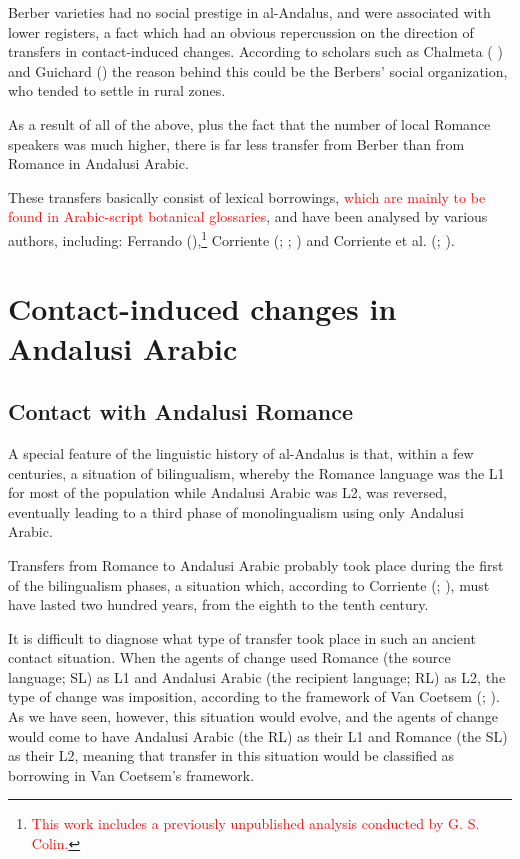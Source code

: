 \documentclass[output=paper,modfonts,nonflat]{langsci/langscibook}
\begin{document}
Berber varieties had no social prestige in al-Andalus, and were associated with lower registers, a fact which had an obvious repercussion on the direction of transfers in contact-induced changes. According to scholars such as Chalmeta ( \citeyear[160]{Chalmeta2003}) and Guichard (\citeyear{Guichard1995}) the reason behind this could be the Berbers’ social organization, who tended to settle in rural zones. 

As a result of all of the above, plus the fact that the number of local Romance speakers was much higher, there is far less transfer from Berber than from Romance in Andalusi Arabic. 

These transfers basically consist of lexical borrowings, \textcolor{red}{which are mainly to be found in Arabic-script botanical glossaries},  and have been analysed by various authors, including: Ferrando (\citeyear{Ferrando1997}),\footnote{\textcolor{red}{This work includes a previously unpublished analysis conducted by G. S. Colin.}} Corriente (\citeyear{Corriente1981}; \citeyear{Corriente1998Berber}; \citeyear{Corriente2002}) and Corriente et al. (\citeyear{CorrientePereiraVicente2017}; \citeyear{CorrientePereiraVicenteforthcoming}).


\section{Contact-induced changes in Andalusi Arabic} 

\subsection{Contact with Andalusi Romance}

A special feature of the linguistic history of al-Andalus is that, within a few centuries, a situation of bilingualism, whereby the Romance language was the L1 for most of the population while Andalusi Arabic was L2, was reversed, eventually leading to a third phase of monolingualism using only Andalusi Arabic. 

Transfers from Romance to Andalusi Arabic probably took place during the first of the bilingualism phases, a situation which, according to Corriente (\citeyear{Corriente2005};  \citeyear{Corriente2008}), must have lasted two hundred years, from the eighth to the tenth century. 

It is difficult to diagnose what type of transfer took place in such an ancient contact situation. When the agents of change used Romance (the source language; SL) as L1 and Andalusi Arabic (the recipient language; RL) as L2, the type of change was imposition, according to the framework of Van Coetsem (\citeyear{VanCoetsem1988}; \citeyear{VanCoetsem2000}). As we have seen, however, this situation would evolve, and the agents of change would come to have Andalusi Arabic (the RL) as their L1 and Romance (the SL) as their L2, meaning that transfer in this situation would be classified as borrowing in Van Coetsem’s framework. 
\end{document}
